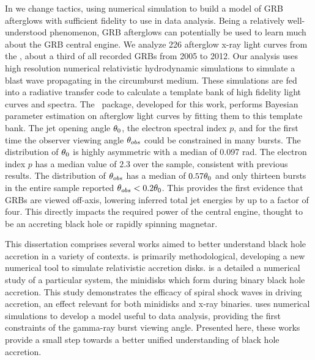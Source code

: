 In  we change tactics, using numerical simulation to build a model of GRB afterglows with sufficient fidelity to use in data analysis.  Being a relatively well-understood phenomenon, GRB afterglows can potentially be used to learn much about the GRB central engine.  We analyze 226 afterglow x-ray light curves from the \swiftXRT, about a third of all recorded GRBs from 2005 to 2012.  Our analysis uses high resolution numerical relativistic hydrodynamic simulations to simulate a blast wave propagating in the circumburst medium.  These simulations are fed into a radiative transfer code to calculate a template bank of high fidelity light curves and spectra.  The \scalefit\ package, developed for this work, performs Bayesian parameter estimation on afterglow light curves by fitting them to this template bank.  The jet opening angle $\theta_0$, the electron spectral index $p$, and for the first time the observer viewing angle $\theta_{obs}$ could be constrained in many bursts.  The distribution of $\theta_0$ is highly asymmetric with a median of 0.097 rad. The electron index $p$ has a median value of $2.3$ over the sample, consistent with previous results.  The distribution of $\theta_{obs}$ has a median of $0.57 \theta_0$ and only thirteen bursts in the entire sample reported $\theta_{obs} < 0.2 \theta_0$.  This provides the first evidence that GRBs are viewed off-axis, lowering inferred total jet energies by up to a factor of four.  This directly impacts the required power of the central engine, thought to be an accreting black hole or rapidly spinning magnetar.


This dissertation comprises several works aimed to better understand black hole accretion in a variety of contexts.   is primarily methodological, developing a new numerical tool to simulate relativistic accretion disks.   is a detailed a numerical study of a particular system, the minidisks which form during binary black hole accretion.  This study demonstrates the efficacy of spiral shock waves in driving accretion, an effect relevant for both minidisks and x-ray binaries.   uses numerical simulations to develop a model useful to data analysis, providing the first constraints of the gamma-ray burst viewing angle.  Presented here, these works provide a small step towards a better unified understanding of black hole accretion.

